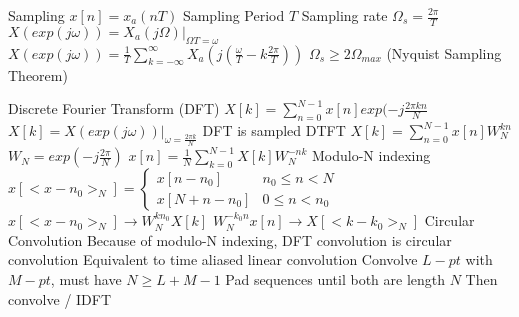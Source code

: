 \documentclass[14pt]{extarticle}
\begin{document}
\begin{outline}
		\1	Sampling
			\2	$x[n] = x_a(nT)$
				\3	Sampling Period $T$
				\3	Sampling rate $\Omega_{s} = \frac{2\pi}{T}$
			\2	$X(exp(j\omega)) = X_a(j\Omega)|_{\Omega T = \omega}$
			\2	$X(exp(j\omega)) = \frac{1}{T}\sum_{k = -\infty}^{\infty} 
					X_a(j(\frac{\omega}{T} - k \frac{2\pi}{T}))$
			\2	$\Omega_s \ge 2\Omega_{max}$ (Nyquist Sampling Theorem)
		
		\1	Discrete Fourier Transform (DFT)
			\2	$X[k] = \sum_{n=0}^{N-1} x[n] exp(-j\frac{2\pi k n}{N}$	
			\2	$X[k] = X(exp(j \omega )) |_{\omega = \frac{2\pi k}{N}}$	
				\3	DFT is sampled DTFT
			\2	$X[k] = \sum_{n=0}^{N-1} x[n] W_N^{kn}$
				\3	$W_N = exp(-j \frac{2\pi}{N})$
			\2	$x[n] = \frac{1}{N}\sum_{k=0}^{N-1}X[k] W_N^{-nk}$
			\2	Modulo-N indexing
				\3	$x[<x - n_0>_N] = \begin{cases}
																x[n - n_0] & n_0 \le n < N \\
																x[N + n - n_0] & 0 \le n < n_0
															\end{cases}$
				\3	$x[<x - n_0>_N] \rightarrow W_N^{kn_0}X[k]$
				\3	$W_N^{-k_0n}x[n] \rightarrow X[<k - k_0>_N]$
			\2	Circular Convolution
				\3	Because of modulo-N indexing, DFT convolution is circular convolution
				\3	Equivalent to time aliased linear convolution
				\3	Convolve $L-pt$ with $M-pt$, must have $N \ge L + M - 1$ 
					\4	Pad sequences until both are length $N$
					\4	Then convolve / IDFT
	\end{outline}
\end{document}
